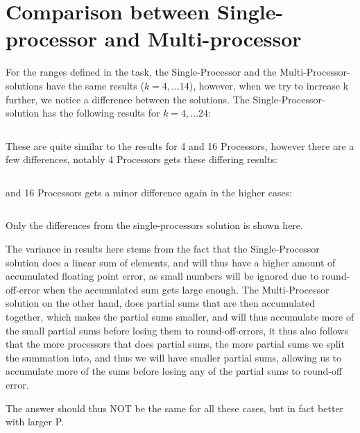 \section{Comparison between Single-processor and Multi-processor}

For the ranges defined in the task, the Single-Processor and the Multi-Processor-solutions
have the same results ($k = 4, ... 14$), however, when we try to increase k further, we
notice a difference between the solutions. The Single-Processor-solution has the following results
for $k = 4, ... 24$:
\inputminted{matlab}{singleout}

These are quite similar to the results for 4 and 16 Processors, however there are a few differences,
notably 4 Processors gets these differing results:

\inputminted{matlab}{4proc}

and 16 Processors gets a minor difference again in the higher cases:

\inputminted{matlab}{16proc}

Only the differences from the single-processors solution is shown here.

The variance in results here stems from the fact that the Single-Processor solution does a linear sum
of elements, and will thus have a higher amount of accumulated floating point error, as small numbers
will be ignored due to round-off-error when the accumulated sum gets large enough. The Multi-Processor
solution on the other hand, does partial sums that are then accumulated together, which makes the partial
sums smaller, and will thus accumulate more of the small partial sums before losing them to round-off-errors,
it thus also follows that the more processors that does partial sums, the more partial sums we split the
summation into, and thus we will have smaller partial sums, allowing us to accumulate more of the sums before
losing any of the partial sums to round-off error.

The answer should thus NOT be the same for all these cases, but in fact better with larger P.


